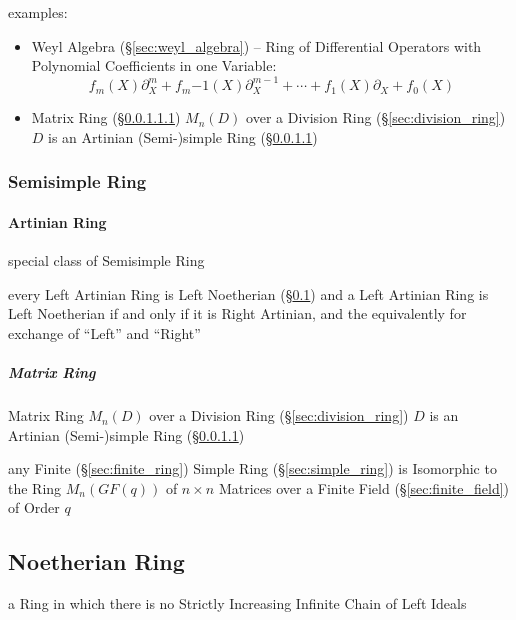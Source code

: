 examples:
\begin{itemize}
  \item Weyl Algebra (\S\ref{sec:weyl_algebra}) -- Ring of Differential
    Operators with Polynomial Coefficients in one Variable:\[
      f_m(X)\partial^m_X + f_m{-1}(X)\partial^{m-1}_X + \cdots +
      f_1(X)\partial_X + f_0(X)
    \]
  \item Matrix Ring (\S\ref{sec:matrix_ring}) $M_n(D)$ over a Division Ring
    (\S\ref{sec:division_ring}) $D$ is an Artinian (Semi-)simple Ring
    (\S\ref{sec:artinian_ring})
\end{itemize}



\subsubsection{Semisimple Ring}\label{sec:semisimple_ring}

\paragraph{Artinian Ring}\label{sec:artinian_ring}\hfill

special class of Semisimple Ring

every Left Artinian Ring is Left Noetherian (\S\ref{sec:noetherian_ring}) and a
Left Artinian Ring is Left Noetherian if and only if it is Right Artinian, and
the equivalently for exchange of ``Left'' and ``Right''



\subparagraph{Matrix Ring}\label{sec:matrix_ring}\hfill

Matrix Ring $M_n(D)$ over a Division Ring (\S\ref{sec:division_ring}) $D$ is an
Artinian (Semi-)simple Ring (\S\ref{sec:artinian_ring})

any Finite (\S\ref{sec:finite_ring}) Simple Ring (\S\ref{sec:simple_ring}) is
Isomorphic to the Ring $M_n(GF(q))$ of $n \times n$ Matrices over a Finite Field
(\S\ref{sec:finite_field}) of Order $q$



\subsection{Noetherian Ring}\label{sec:noetherian_ring}

a Ring in which there is no Strictly Increasing Infinite Chain of Left Ideals


